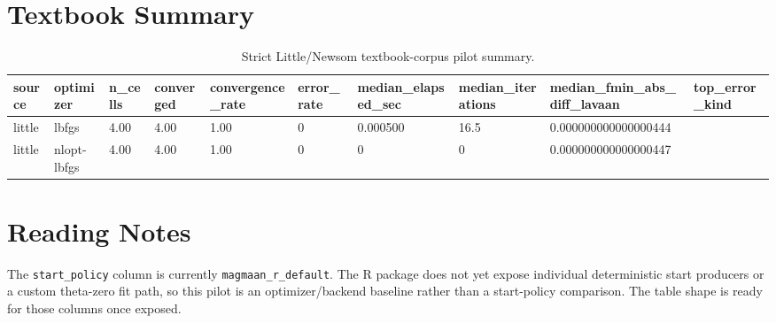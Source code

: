 \documentclass[11pt]{article}
\begin{document}
\section*{Textbook Summary}
\begin{table}[ht]
\centering
\caption{Strict Little/Newsom textbook-corpus pilot summary.}
\begin{tabular}{llllllllll}
\hline
source & optimizer & n\_cells & converged & convergence\_rate & error\_rate & median\_elapsed\_sec & median\_iterations & median\_fmin\_abs\_diff\_lavaan & top\_error\_kind
\\ \hline
little & lbfgs & 4.00 & 4.00 & 1.00 & 0 & 0.000500 & 16.5 & 0.000000000000000444 &  \\
little & nlopt-lbfgs & 4.00 & 4.00 & 1.00 & 0 & 0 & 0 & 0.000000000000000447 &  \\
\hline
\end{tabular}
\end{table}
\section*{Reading Notes}
The \texttt{start\_policy} column is currently \texttt{magmaan\_r\_default}. The R package does not yet expose individual deterministic start producers or a custom theta-zero fit path, so this pilot is an optimizer/backend baseline rather than a start-policy comparison. The table shape is ready for those columns once exposed.
\end{document}
